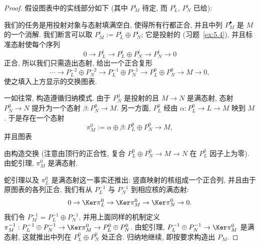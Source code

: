 \begin{proof}
假设图表中的实线部分如下 (其中 $P_M^i$ 待定, 而 $P_L^i$, $P_N^i$ 已给):
\begin{center}
\end{center}
我们的任务是用投射对象与态射填满空白, 使得所有行都正合, 并且中列 $P_M^\bullet$ 是 $M$ 的一个消解. 我们断言可以取 $P_M^i:=P_L^i\oplus P_N^i$; 它是投射的 (习题~\ref{ex:5.4}), 并且标准态射使每个序列
\[
0\to P_L^i\to P_L^i\oplus P_N^i\to P_N^i\to 0
\]
正合, 所以我们只需造出态射, 给出一个正合复形
\[
\cdots\to P_L^{-2}\oplus P_N^{-2}\to P_L^{-1}\oplus P_N^{-1}\to P_L^0\oplus P_N^0\to M\to 0,
\]
使之填入上方显示的交换图表.

一如往常, 构造遵循归纳模式. 由于 $P_N^0$ 是投射的且 $M\to N$ 是满态射, 态射 $P_N^0\to N$ 提升为一个态射 $\beta:P_N^0\to M$. 另一方面, $P_L^0$ 经由 $\alpha:P_L^0\to L\to M$ 映到 $M$. 于是存在一个态射
\[
\pi_M^0 := \alpha\oplus\beta : P_L^0\oplus P_N^0\to M,
\]
并且图表
\begin{center}
\end{center}
由构造交换 (注意由顶行的正合性, 复合 $P_L^0\oplus P_N^0\to M\to N$ 在 $P_L^0$ 因子上为零). 由蛇引理, $\pi_M^0$ 是满态射.

蛇引理以及 $\pi_L^0$ 是满态射这一事实还推出: 竖直映射的核组成一个正合列, 并且由于原图表的各列正合, 我们有从 $P_L^{-1}$ 与 $P_N^{-1}$ 到相应核的满态射:
\[
0\to\Ker\pi_L^0\to\Ker\pi_M^0\to\Ker\pi_N^0\to 0.
\]
我们令 $P_M^{-1}=P_L^{-1}\oplus P_N^{-1}$, 并用上面同样的机制定义 $\pi_M^{-1}:P_L^{-1}\oplus P_N^{-1}\to\Ker\pi_M^0\to P_L^0\oplus P_N^0$. 由蛇引理, $P_L^{-1}\oplus P_N^{-1}\to\Ker\pi_M^0$ 是满态射, 这就推出中列在 $P_L^0\oplus P_N^0$ 处正合. 归纳地继续, 即按要求构造出 $P_M$.
\end{proof}

